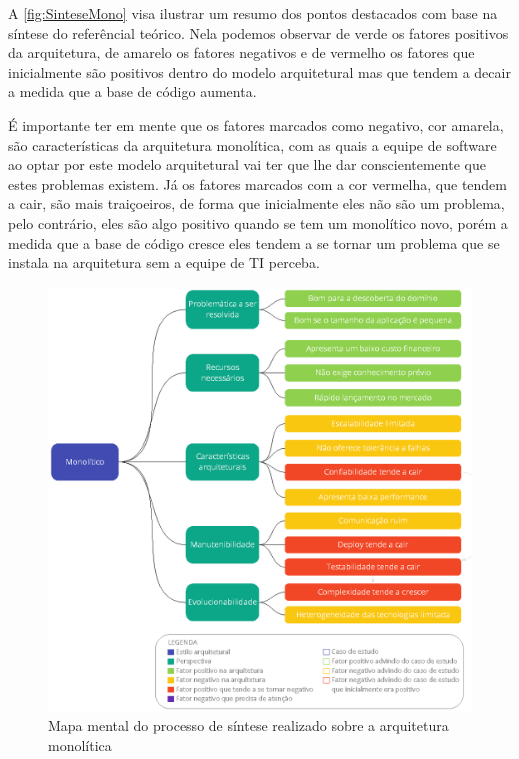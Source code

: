 \newpage

A \autoref{fig:SinteseMono} visa ilustrar um resumo dos pontos destacados com base na síntese do
referêncial teórico. Nela podemos observar de verde os fatores positivos da arquitetura, de amarelo
os fatores negativos e de vermelho os fatores que inicialmente são positivos dentro do modelo
arquitetural mas que tendem a decair a medida que a base de código aumenta.

É importante ter em mente que os fatores marcados como negativo, cor amarela, são características da
arquitetura monolítica, com as quais a equipe de software ao optar por este modelo arquitetural vai
ter que lhe dar conscientemente que estes problemas existem. Já os fatores marcados com a cor
vermelha, que tendem a cair, são mais traiçoeiros, de forma que inicialmente eles não são um
problema, pelo contrário, eles são algo positivo quando se tem um monolítico novo, porém a medida que
a base de código cresce eles tendem a se tornar um problema que se instala na arquitetura sem a
equipe de \gls{TI} perceba.

\begin{figure}[h]
  \centering
  \includegraphics[keepaspectratio=true,scale=1]{figuras/sintese-monolitico.eps}
  \caption{Mapa mental do processo de síntese realizado sobre a arquitetura monolítica\label{fig:SinteseMono}}
\end{figure}

